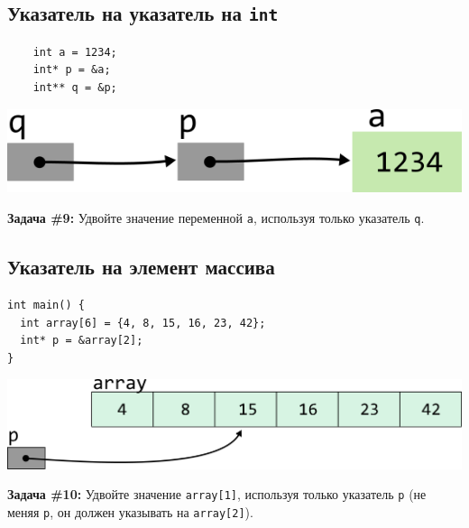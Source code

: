 \documentclass{article}
\begin{document}
\subsection*{Указатель на указатель на \texttt{int}}

\begin{multicols}{2}
\begin{lstlisting}
	int a = 1234;
	int* p = &a;
	int** q = &p;
\end{lstlisting}
\columnbreak
\begin{center}
\includegraphics[scale=1]{../images/pointer_schemes/pointer_to_pointer_to_int.png}
\end{center}
\end{multicols}
\textbf{Задача \#9:} Удвойте значение переменной \texttt{a}, используя только указатель \texttt{q}.

\newpage
\subsection*{Указатель на элемент массива}
\begin{multicols}{2}
\begin{lstlisting}
int main() {
  int array[6] = {4, 8, 15, 16, 23, 42};
  int* p = &array[2];
}
\end{lstlisting}
\columnbreak
\begin{center}
\includegraphics[scale=0.75]{../images/pointer_schemes/pointer_to_array_of_ints.png}
\end{center}
\end{multicols}

\textbf{Задача \#10:} Удвойте значение \texttt{array[1]}, используя только указатель \texttt{p} (не меняя \texttt{p}, он должен указывать на \texttt{array[2]}).
\end{document}
